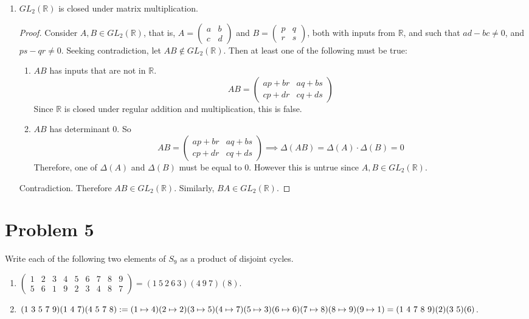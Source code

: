 \documentclass[a4paper,12pt]{extarticle}
\theoremstyle{definition}
\newcommand{\R}{\mathbb{R}} \newcommand{\Q}{\mathbb{Q}} \newcommand{\Z}{\mathbb{Z}} \newcommand{\N}{\mathbb{N}} \newcommand{\myskip}{\par\null\par} \renewcommand\qedsymbol{QED} \renewcommand{\leq}{\leqslant}\renewcommand{\geq}{\geqslant}
\begin{document}
\begin{enumerate}[label=(\alph*)]
\begin{proof}
        \end{proof}
        \item $GL_2(\R)$ is closed under matrix multiplication.\begin{proof}
        Consider $A,B\in GL_2(\R)$, that is, $A=\begin{pmatrix}a & b \\c & d\end{pmatrix}$ and $B=\begin{pmatrix}p & q \\r & s\end{pmatrix}$, both with inputs from $\R$, and such that $ad-bc\neq0$, and $ps-qr\neq0$. Seeking contradiction, let $AB\not\in GL_2(\R)$. Then at least one of the following must be true:\begin{enumerate}[label=\arabic*)]
            \item $AB$ has inputs that are not in $\R$. $$AB=\begin{pmatrix}ap+br&aq+bs\\ cp+dr&cq+ds\end{pmatrix}$$ Since $\R$ is closed under regular addition and multiplication, this is false.
            \item $AB$ has determinant 0. So $$AB=\begin{pmatrix}ap+br&aq+bs\\ cp+dr&cq+ds\end{pmatrix}\implies \Delta(AB)=\Delta(A)\cdot\Delta(B)=0$$ Therefore, one of $\Delta(A)$ and $\Delta(B)$ must be equal to 0. However this is untrue since $A,B\in GL_2(\R)$.
        \end{enumerate} Contradiction. Therefore $AB\in GL_2(\R)$. Similarly, $BA\in GL_2(\R)$.
        \end{proof}
    \end{enumerate}
    \section*{Problem 5}Write each of the following two elements of $S_9$ as a product of disjoint cycles.
        \begin{enumerate}[label=(\alph*)]
            \item $\left(\begin{array}{lllllllll}1 & 2 & 3 & 4 & 5 & 6 & 7 & 8 & 9 \\ 5 & 6 & 1 & 9 & 2 & 3 & 4 & 8     & 7\end{array}\right)=(1\ 5\ 2\ 6\ 3)(4\ 9\ 7)(8)$.
            \item 
                $(1\ 3\ 5\ 7\ 9)(1\ 4\ 7)(4\ 5\ 7\ 8):=\\(1\mapsto4)(2\mapsto2)(3\mapsto5)(4\mapsto7)(5\mapsto3)(6\mapsto6)(7\mapsto8)(8\mapsto9)(9\mapsto1)\\=(1\ 4\ 7\ 8\ 9)(2)(3\ 5)(6)$.
\end{enumerate}
\end{document}
